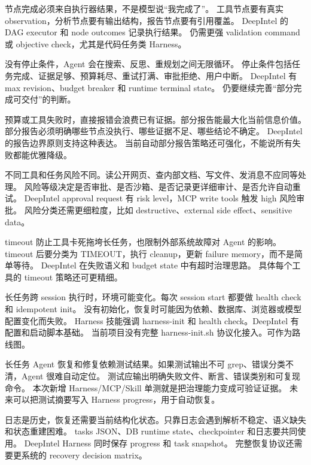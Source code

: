 {节点完成必须来自执行器结果，不是模型说“我完成了”。}
{工具节点要有真实 observation，分析节点要有输出结构，报告节点要有引用覆盖。}
{DeepIntel 的 DAG executor 和 node outcomes 记录执行结果。}
{仍需更强 validation command 或 objective check，尤其是代码任务类 Harness。}

{没有停止条件，Agent 会在搜索、反思、重规划之间无限循环。}
{停止条件包括任务完成、证据足够、预算耗尽、重试打满、审批拒绝、用户中断。}
{DeepIntel 有 max revision、budget breaker 和 runtime terminal state。}
{仍要继续完善“部分完成可交付”的判断。}

{预算或工具失败时，直接报错会浪费已有证据。部分报告能最大化当前信息价值。}
{部分报告必须明确哪些节点没执行、哪些证据不足、哪些结论不确定。}
{DeepIntel 的报告边界原则支持这种表达。}
{当前自动部分报告策略还可强化，不能说所有失败都能优雅降级。}

{不同工具和任务风险不同。读公开网页、查内部文档、写文件、发消息不应同等处理。}
{风险等级决定是否审批、是否沙箱、是否记录更详细审计、是否允许自动重试。}
{DeepIntel approval request 有 risk level，MCP write tools 触发 high 风险审批。}
{风险分类还需更细粒度，比如 destructive、external side effect、sensitive data。}

{timeout 防止工具卡死拖垮长任务，也限制外部系统故障对 Agent 的影响。}
{timeout 后要分类为 TIMEOUT，执行 cleanup，更新 failure memory，而不是简单等待。}
{DeepIntel 在失败语义和 budget state 中有超时治理思路。}
{具体每个工具的 timeout 策略还可更精细。}

{长任务跨 session 执行时，环境可能变化。每次 session start 都要做 health check 和 idempotent init。}
{没有初始化，恢复时可能因为依赖、数据库、浏览器或模型配置变化而失败。}
{Harness 技能强调 harness-init 和 health check。DeepIntel 有配置和启动脚本基础。}
{当前项目没有完整 harness-init.sh 协议化接入。可作为路线图。}

{长任务 Agent 恢复和修复依赖测试结果。如果测试输出不可 grep、错误分类不清，Agent 很难自动定位。}
{测试应输出明确失败文件、断言、错误类别和可复现命令。}
{本次新增 Harness/MCP/Skill 单测就是把治理能力变成可验证证据。}
{未来可以把测试摘要写入 Harness progress，用于自动恢复。}

{日志是历史，恢复还需要当前结构化状态。只靠日志会遇到解析不稳定、语义缺失和状态重建困难。}
{tasks JSON、DB runtime state、checkpointer 和日志要共同使用。}
{DeepIntel Harness 同时保存 progress 和 task snapshot。}
{完整恢复协议还需要更系统的 recovery decision matrix。}

